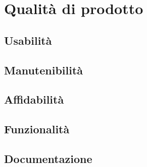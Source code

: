 
\section{Qualità di prodotto}
\subsection{Usabilità}
\subsection{Manutenibilità}
\subsection{Affidabilità}
\subsection{Funzionalità}
\subsection{Documentazione}

